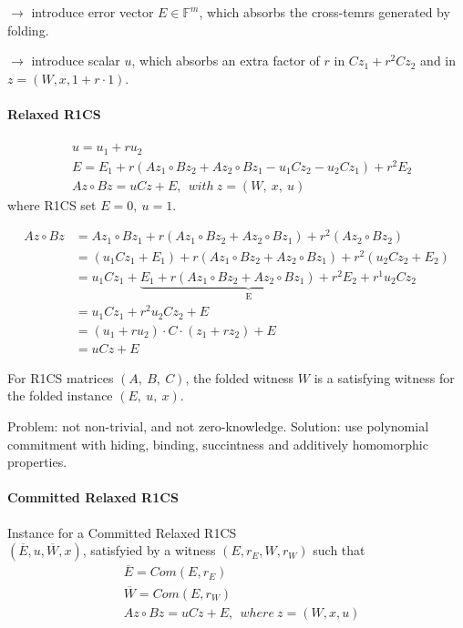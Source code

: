 \documentclass{article}
\theoremstyle{definition}
\begin{document}
$\longrightarrow$ introduce error vector $E \in \mathbb{F}^m$, which absorbs the cross-temrs generated by folding.

$\longrightarrow$ introduce scalar $u$, which absorbs an extra factor of $r$ in $C z_1 + r^2 C z_2$ and in $z=(W, x, 1+r\cdot 1)$.

\paragraph{Relaxed R1CS}
\begin{align*}
	&u=u_1+r u_2\\
	&E=E_1 + r (A z_1 \circ B z_2 + A z_2 \circ B z_1 - u_1 C z_2 - u_2 C z_1) + r^2 E_2\\
	&Az \circ Bz = uCz + E,~~ with~ z=(W,~x,~u)
\end{align*}
where R1CS set $E=0,~u=1$.

\begin{align*}
	Az \circ Bz &= A z_1 \circ B z_1 + r(A z_1 \circ B z_2 + A z_2 \circ B z_1) + r^2 (A z_2 \circ B z_2)\\
		    &= (u_1 C z_1 + E_1) + r (A z_1 \circ B z_2 + A z_2 \circ B z_1) + r^2 (u_2 C z_2 + E_2)\\
		    &= u_1 C z_1 + \underbrace{E_1 + r(A z_1 \circ B z_2 + A z_2 \circ B z_1) + r^2 E_2}_\text{E} + r^1 u_2 C z_2\\
		    &= u_1 C z_1 + r^2 u_2 C z_2 + E\\
		    &= (u_1 + r u_2) \cdot C \cdot (z_1 + r z_2) + E\\
		    &= uCz + E
\end{align*}

For R1CS matrices $(A,~B,~C)$, the folded witness $W$ is a satisfying witness for the folded instance $(E,~u,~x)$.



\vspace{20px}
Problem: not non-trivial, and not zero-knowledge. Solution: use polynomial commitment with hiding, binding, succintness and additively homomorphic properties.

\paragraph{Committed Relaxed R1CS}
Instance for a Committed Relaxed R1CS\\
$(\overline{E}, u, \overline{W}, x)$, satisfyied by a witness $(E, r_E, W, r_W)$ such that
\begin{align*}
	&\overline{E} = Com(E, r_E)\\
	&\overline{W} = Com(E, r_W)\\
	&Az \circ Bz = uCz+E,~~ where~z=(W, x, u)
\end{align*}
\end{document}
